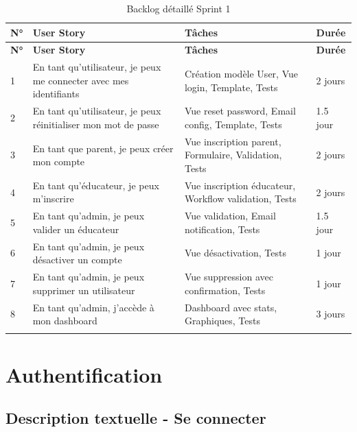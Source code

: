 \documentclass[12pt,a4paper]{report}
\begin{document}
\begin{longtable}{|p{0.5cm}|p{6cm}|p{6cm}|p{1.5cm}|}
\hline
\textbf{N°} & \textbf{User Story} & \textbf{Tâches} & \textbf{Durée} \\
\hline
\endfirsthead
\hline
\textbf{N°} & \textbf{User Story} & \textbf{Tâches} & \textbf{Durée} \\
\hline
\endhead

1 & En tant qu'utilisateur, je peux me connecter avec mes identifiants & Création modèle User, Vue login, Template, Tests & 2 jours \\
\hline
2 & En tant qu'utilisateur, je peux réinitialiser mon mot de passe & Vue reset password, Email config, Template, Tests & 1.5 jour \\
\hline
3 & En tant que parent, je peux créer mon compte & Vue inscription parent, Formulaire, Validation, Tests & 2 jours \\
\hline
4 & En tant qu'éducateur, je peux m'inscrire & Vue inscription éducateur, Workflow validation, Tests & 2 jours \\
\hline
5 & En tant qu'admin, je peux valider un éducateur & Vue validation, Email notification, Tests & 1.5 jour \\
\hline
6 & En tant qu'admin, je peux désactiver un compte & Vue désactivation, Tests & 1 jour \\
\hline
7 & En tant qu'admin, je peux supprimer un utilisateur & Vue suppression avec confirmation, Tests & 1 jour \\
\hline
8 & En tant qu'admin, j'accède à mon dashboard & Dashboard avec stats, Graphiques, Tests & 3 jours \\
\hline

\caption{Backlog détaillé Sprint 1}
\end{longtable}

\section{Authentification}

\subsection{Description textuelle - Se connecter}
\end{document}
